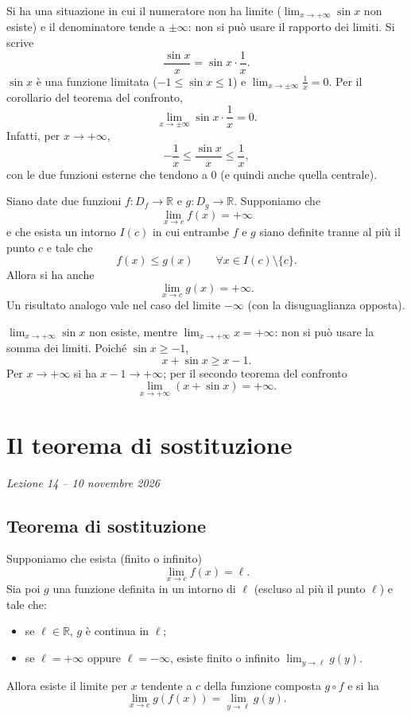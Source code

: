 \documentclass[11pt,a4paper]{article}
\begin{document}
\begin{esempio}
Si ha una situazione in cui il numeratore non ha limite ($\lim_{x\to+\infty}\sin x$ non esiste) e il denominatore tende a $\pm\infty$: non si può usare il rapporto dei limiti. Si scrive
\[
  \frac{\sin x}{x} = \sin x\cdot\frac{1}{x}.
\]
$\sin x$ è una funzione limitata ($-1 \le \sin x \le 1$) e $\lim_{x\to\pm\infty}\frac{1}{x} = 0$. Per il corollario del teorema del confronto,
\[
  \lim_{x\to\pm\infty}\sin x\cdot\frac{1}{x} = 0.
\]
Infatti, per $x \to +\infty$,
\[
  -\frac{1}{x} \le \frac{\sin x}{x} \le \frac{1}{x},
\]
con le due funzioni esterne che tendono a $0$ (e quindi anche quella centrale).
\end{esempio}

\begin{teorema}
Siano date due funzioni $f : D_f \to \mathbb{R}$ e $g : D_g \to \mathbb{R}$. Supponiamo che
\[
  \lim_{x\to c} f(x) = +\infty
\]
e che esista un intorno $I(c)$ in cui entrambe $f$ e $g$ siano definite tranne al più il punto $c$ e tale che
\[
  f(x) \le g(x) \qquad \forall x \in I(c)\setminus\{c\}.
\]
Allora si ha anche
\[
  \lim_{x\to c} g(x) = +\infty.
\]
Un risultato analogo vale nel caso del limite $-\infty$ (con la disuguaglianza opposta).
\end{teorema}

\begin{esempio}
$\lim_{x\to+\infty}\sin x$ non esiste, mentre $\lim_{x\to+\infty} x = +\infty$: non si può usare la somma dei limiti. Poiché $\sin x \ge -1$,
\[
  x + \sin x \ge x - 1 .
\]
Per $x \to +\infty$ si ha $x - 1 \to +\infty$; per il secondo teorema del confronto
\[
  \lim_{x\to+\infty}(x + \sin x) = +\infty.
\]
\end{esempio}

\section[Il teorema di sostituzione (Lezione 14 -- 10 novembre 2026)]{Il teorema di sostituzione}
\noindent\emph{Lezione 14 -- 10 novembre 2026}

\subsection{Teorema di sostituzione}

\begin{teorema}
Supponiamo che esista (finito o infinito)
\[
  \lim_{x\to c} f(x) = \ell .
\]
Sia poi $g$ una funzione definita in un intorno di $\ell$ (escluso al più il punto $\ell$) e tale che:
\begin{itemize}
  \item[(i)] se $\ell \in \mathbb{R}$, $g$ è continua in $\ell$;
  \item[(ii)] se $\ell = +\infty$ oppure $\ell = -\infty$, esiste finito o infinito $\displaystyle\lim_{y\to\ell} g(y)$.
\end{itemize}
Allora esiste il limite per $x$ tendente a $c$ della funzione composta $g\circ f$ e si ha
\[
  \lim_{x\to c} g(f(x)) = \lim_{y\to\ell} g(y).
\]
\end{teorema}
\end{document}
